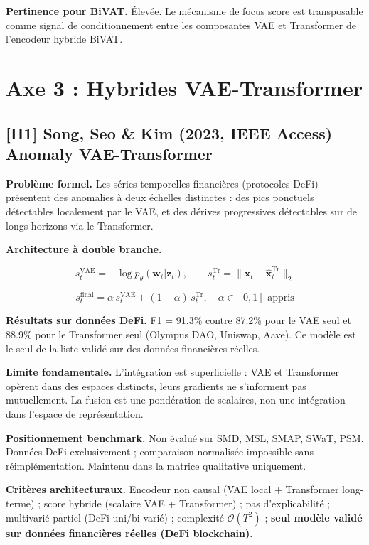 \documentclass[12pt,a4paper]{article}
\begin{document}
\textbf{Pertinence pour BiVAT.} Élevée. Le mécanisme de focus score est
transposable comme signal de conditionnement entre les composantes VAE et
Transformer de l'encodeur hybride BiVAT.

\section{Axe 3 : Hybrides VAE-Transformer}

\subsection{[H1] Song, Seo \& Kim (2023, IEEE Access) 
Anomaly VAE-Transformer}

\textbf{Problème formel.} Les séries temporelles financières (protocoles DeFi)
présentent des anomalies à deux échelles distinctes : des pics ponctuels
détectables localement par le VAE, et des dérives progressives détectables sur
de longs horizons via le Transformer.

\textbf{Architecture à double branche.}

$$s^{\mathrm{VAE}}_t = -\log p_\theta(\mathbf{w}_t|\mathbf{z}_t), \qquad
s^{\mathrm{Tr}}_t = \|\mathbf{x}_t - \hat{\mathbf{x}}^{\mathrm{Tr}}_t\|_2$$

$$s_t^{\mathrm{final}} = \alpha\,s^{\mathrm{VAE}}_t +
(1-\alpha)\,s^{\mathrm{Tr}}_t, \quad \alpha \in [0,1]\text{ appris}$$

\textbf{Résultats sur données DeFi.} F1 = 91.3\% contre 87.2\% pour le VAE
seul et 88.9\% pour le Transformer seul (Olympus DAO, Uniswap, Aave). Ce modèle
est le seul de la liste validé sur des données financières réelles.

\textbf{Limite fondamentale.} L'intégration est superficielle : VAE et
Transformer opèrent dans des espaces distincts, leurs gradients ne s'informent
pas mutuellement. La fusion est une pondération de scalaires, non une
intégration dans l'espace de représentation.

\textbf{Positionnement benchmark.} Non évalué sur SMD, MSL, SMAP, SWaT, PSM.
Données DeFi exclusivement ; comparaison normalisée impossible sans
réimplémentation. Maintenu dans la matrice qualitative uniquement.

\textbf{Critères architecturaux.} Encodeur non causal (VAE local + Transformer
long-terme) ; score hybride (scalaire VAE + Transformer) ; pas d'explicabilité ;
multivarié partiel (DeFi uni/bi-varié) ; complexité $\mathcal{O}(T^2)$ ;
\textbf{seul modèle validé sur données financières réelles (DeFi blockchain)}.
\end{document}

